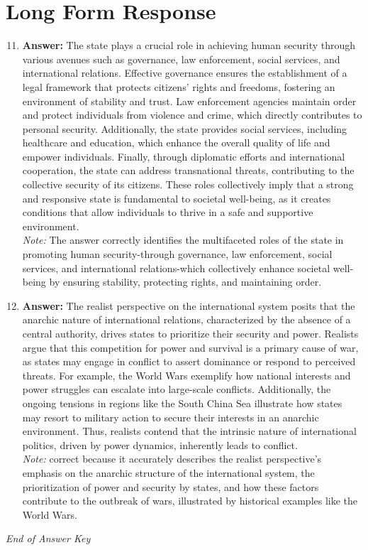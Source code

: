 \documentclass[12pt]{article}
\begin{document}
\section*{Long Form Response}
\begin{enumerate}[label=\arabic*.]
\setcounter{enumi}{10}
\item \textbf{Answer:} The state plays a crucial role in achieving human security through various avenues such as governance, law enforcement, social services, and international relations. Effective governance ensures the establishment of a legal framework that protects citizens' rights and freedoms, fostering an environment of stability and trust. Law enforcement agencies maintain order and protect individuals from violence and crime, which directly contributes to personal security. Additionally, the state provides social services, including healthcare and education, which enhance the overall quality of life and empower individuals. Finally, through diplomatic efforts and international cooperation, the state can address transnational threats, contributing to the collective security of its citizens. These roles collectively imply that a strong and responsive state is fundamental to societal well-being, as it creates conditions that allow individuals to thrive in a safe and supportive environment.
\\ \textit{Note:} The answer correctly identifies the multifaceted roles of the state in promoting human security-through governance, law enforcement, social services, and international relations-which collectively enhance societal well-being by ensuring stability, protecting rights, and maintaining order.
\item \textbf{Answer:} The realist perspective on the international system posits that the anarchic nature of international relations, characterized by the absence of a central authority, drives states to prioritize their security and power. Realists argue that this competition for power and survival is a primary cause of war, as states may engage in conflict to assert dominance or respond to perceived threats. For example, the World Wars exemplify how national interests and power struggles can escalate into large-scale conflicts. Additionally, the ongoing tensions in regions like the South China Sea illustrate how states may resort to military action to secure their interests in an anarchic environment. Thus, realists contend that the intrinsic nature of international politics, driven by power dynamics, inherently leads to conflict.
\\ \textit{Note:} correct because it accurately describes the realist perspective's emphasis on the anarchic structure of the international system, the prioritization of power and security by states, and how these factors contribute to the outbreak of wars, illustrated by historical examples like the World Wars.
\end{enumerate}

\vfill
\noindent\textit{End of Answer Key}
\end{document}
